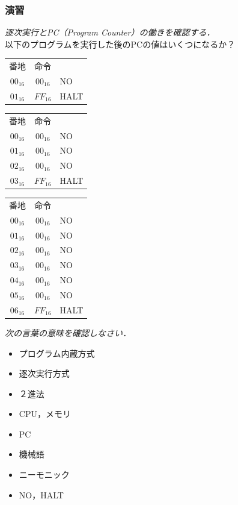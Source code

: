 \documentclass{beamer}                 %
\begin{document}
\begin{frame}
  \frametitle{演習}
  \emph{逐次実行とPC（Program Counter）の働きを確認する．}\\
  以下のプログラムを実行した後のPCの値はいくつになるか？\\
  \begin{multicols}{3}
  {\ttfamily\small\begin{center}
    \begin{tabular}{c|c|l}
      \multicolumn{1}{c}{番地} & \multicolumn{1}{c}{命令} &  \\
      \cline{2-2}
      $00_{16}$ & $00_{16}$ & NO \\
      $01_{16}$ & $FF_{16}$ & HALT \\
      \cline{2-2}
    \end{tabular}
    \columnbreak
    \begin{tabular}{c|c|l}
      \multicolumn{1}{c}{番地} & \multicolumn{1}{c}{命令} &  \\
      \cline{2-2}
      $00_{16}$ & $00_{16}$ & NO \\
      $01_{16}$ & $00_{16}$ & NO \\
      $02_{16}$ & $00_{16}$ & NO \\
      $03_{16}$ & $FF_{16}$ & HALT \\
      \cline{2-2}
    \end{tabular}
    \begin{tabular}{c|c|l}
      \multicolumn{1}{c}{番地} & \multicolumn{1}{c}{命令} &  \\
      \cline{2-2}
      $00_{16}$ & $00_{16}$ & NO \\
      $01_{16}$ & $00_{16}$ & NO \\
      $02_{16}$ & $00_{16}$ & NO \\
      $03_{16}$ & $00_{16}$ & NO \\
      $04_{16}$ & $00_{16}$ & NO \\
      $05_{16}$ & $00_{16}$ & NO \\
      $06_{16}$ & $FF_{16}$ & HALT \\
      \cline{2-2}
    \end{tabular}
  \end{center}}
  \end{multicols}
  \vfill
  \emph{次の言葉の意味を確認しなさい．}
  \begin{multicols}{2}
  \begin{itemize}
  \item プログラム内蔵方式
  \item 逐次実行方式
  \item ２進法
  \item CPU，メモリ
  \item PC
  \item 機械語
  \item ニーモニック
  \item NO，HALT
  \end{itemize}
  \end{multicols}
  \vfill
\end{frame}

\end{document}

